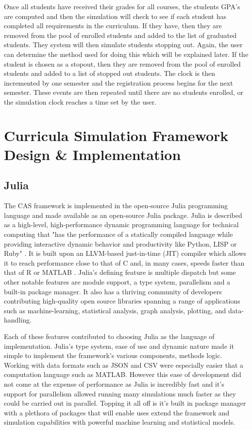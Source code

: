 \documentclass[botnum, fleqn]{unmeethesis}
\begin{document}
  Once all students have received their grades for all courses, the students GPA's are computed and then the simulation will check to see if each student has completed all requirements in the curriculum. If they have, then they are removed from the pool of enrolled students and added to the list of graduated students. They system will then simulate students stopping out. Again, the user can determine the method used for doing this which will be explained later. If the student is chosen as a stopout, then they are removed from the pool of enrolled students and added to a list of stopped out students. The clock is then incremented by one semester and the registration process begins for the next semester. These events are then repeated until there are no students enrolled, or the simulation clock reaches a time set by the user.


\chapter{Curricula Simulation Framework Design \& Implementation}

  \section{Julia}
    The CAS framework is implemented in the open-source Julia programming language and made available as an open-source Julia package. Julia is described as a high-level, high-performance dynamic programming language for technical computing that "has the performance of a statically compiled language while providing interactive dynamic behavior and productivity like Python, LISP or Ruby" \cite{Julia}. It is built upon an LLVM-based just-in-time (JIT) compiler which allows it to reach performance close to that of C and, in many cases, speeds faster than that of R or MATLAB \cite{Julia}. Julia's defining feature is multiple dispatch but some other notable features are module support, a type system, parallelism and a built-in package manager. It also has a thriving community of developers contributing high-quality open source libraries spanning a range of applications such as machine-learning, statistical analysis, graph analysis, plotting, and data-handling.

    Each of these features contributed to choosing Julia as the language of implementation. Julia's type system, ease of use and dynamic nature made it simple to implement the framework's various components, methods logic. Working with data formats such as JSON and CSV were especially easier that a computation language such as MATLAB. However this ease of development did not come at the expense of performance as Julia is incredibly fast and it's support for parallelism allowed running many simulations much faster as they could be carried out in parallel. Topping it all off is it's built in package manager with a plethora of packages that will enable uses extend the framework and simulation capabilities with powerful machine learning and statistical models.
\end{document}
